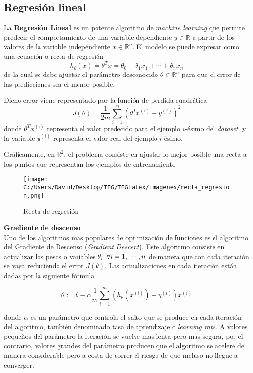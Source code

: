 \subsection{Regresión lineal}
La \textbf{Regresión Lineal} es un potente algoritmo de \textit{machine learning} que 
permite predecir el comportamiento de una variable dependiente $y \in \mathds{R}$ a partir de los 
valores de la variable independiente $x \in \mathds{R}^n$.
El modelo se puede expresar como una ecuación o recta de regresión 
$$h_{\theta}(x) = \theta^T x = \theta_0 + \theta_1 x_1 + \cdots + \theta_n x_n$$
de la cual se debe ajustar el parámetro desconocido $\theta \in \mathds{R}^n$ para que el error 
de las predicciones sea el menor posible.

Dicho error viene representado por la función de perdida cuadrática
$$J(\theta) = \frac{1}{2m} \sum_{i=1}^{m}(\theta^Tx^{(i)} - y^{(i)})^2$$
donde $\theta^Tx^{(i)}$ representa el valor predecido para el ejemplo $i$-ésimo del \textit{dataset}, y la variable 
$y^{(i)}$ representa el valor real del ejemplo $i$-ésimo.

Gráficamente, en $\mathds{R}^2$, el problema consiste en ajustar lo mejor posible una recta a los 
puntos que representan los ejemplos de entrenamiento

\begin{figure}[h]
  \centering
  \texttt{[image: C:/Users/David/Desktop/TFG/TFGLatex/imagenes/recta\_regresion.png]}
  \caption[Regresión lineal en $\mathds{R}^2$]{Recta de regresión}
  \label{recta_regresion}
\end{figure}

\noindent \textbf{Gradiente de descenso}\\
Uno de los algoritmos mas populares de optimización de funciones es el algoritmo del Gradiente 
de Descenso 
(\href{https://en.wikipedia.org/wiki/Gradient_descent}{\textit{Gradient Descent}}).
Este algoritmo consiste en actualizar los pesos o variables $\theta_i \enskip \forall i=1, \cdots, n$ de 
manera que con cada iteración se vaya reduciendo el error $J(\theta)$.
Las actualizaciones en cada iteración están dadas por la siguiente fórmula~\cite{DBLP:books/lib/Bishop07}

\begin{equation}
\theta := \theta - \alpha \frac{1}{m} \sum_{i=1}^{m}(h_{\theta}(x^{(i)}) - y^{(i)})x^{(i)}
\end{equation}

donde $\alpha$ es un parámetro que controla el salto que se produce en cada iteración del algoritmo, 
también denominado tasa de aprendizaje o \textit{learning rate}.
A valores pequeños del parámetro la iteración se vuelve mas lenta pero mas segura, por el contrario, 
valores grandes del parámetro producen que el algoritmo se acelere de manera considerable pero a costa 
de correr el riesgo de que incluso no llegue a converger.

